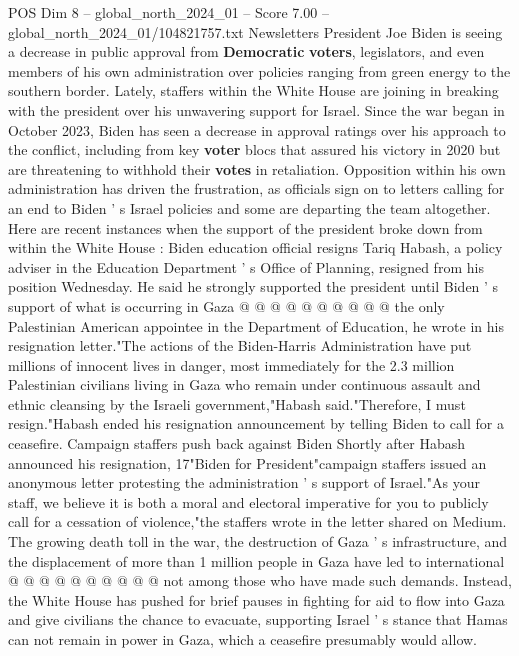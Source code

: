 \begin{textsample}{POS Dim 8 – global\_north\_2024\_01 – Score 7.00 – global\_north\_2024\_01/104821757.txt}  \label{ex:f8_pos_188}
Newsletters President Joe Biden is seeing a decrease in public approval from \textbf{Democratic} \textbf{voters}, legislators, and even members of his own administration over policies ranging from green energy to the southern border.
Lately, staffers within the White House are joining in breaking with the president over his unwavering support for Israel.
Since the war began in October 2023, Biden has seen a decrease in approval ratings over his approach to the conflict, including from key \textbf{voter} blocs that assured his victory in 2020 but are threatening to withhold their \textbf{votes} in retaliation.
Opposition within his own administration has driven the frustration, as officials sign on to letters calling for an end to Biden ' s Israel policies and some are departing the team altogether.
Here are recent instances when the support of the president broke down from within the White House : Biden education official resigns Tariq Habash, a policy adviser in the Education Department ' s Office of Planning, resigned from his position Wednesday.
He said he strongly supported the president until Biden ' s support of what is occurring in Gaza @ @ @ @ @ @ @ @ @ @ the only Palestinian American appointee in the Department of Education, he wrote in his resignation letter."The actions of the Biden-Harris Administration have put millions of innocent lives in danger, most immediately for the 2.3 million Palestinian civilians living in Gaza who remain under continuous assault and ethnic cleansing by the Israeli government,"Habash said."Therefore, I must resign."Habash ended his resignation announcement by telling Biden to call for a ceasefire.
Campaign staffers push back against Biden Shortly after Habash announced his resignation, 17"Biden for President"campaign staffers issued an anonymous letter protesting the administration ' s support of Israel."As your staff, we believe it is both a moral and electoral imperative for you to publicly call for a cessation of violence,"the staffers wrote in the letter shared on Medium.
The growing death toll in the war, the destruction of Gaza ' s infrastructure, and the displacement of more than 1 million people in Gaza have led to international @ @ @ @ @ @ @ @ @ @ not among those who have made such demands.
Instead, the White House has pushed for brief pauses in fighting for aid to flow into Gaza and give civilians the chance to evacuate, supporting Israel ' s stance that Hamas can not remain in power in Gaza, which a ceasefire presumably would allow.

\end{textsample}
